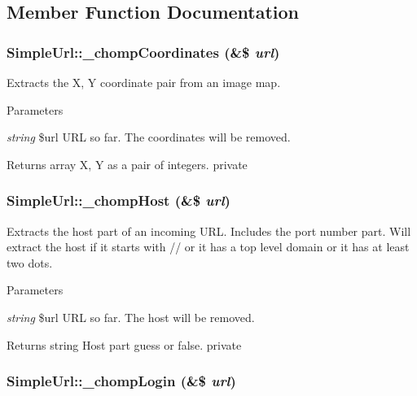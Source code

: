 \subsection{Member Function Documentation}
\hypertarget{class_simple_url_ad8bf75a7593335e51703bfbf083af970}{
\subsubsection[{\_\-chompCoordinates}]{\setlength{\rightskip}{0pt plus 5cm}SimpleUrl::\_\-chompCoordinates (\&\$ {\em url})}}
\label{class_simple_url_ad8bf75a7593335e51703bfbf083af970}
Extracts the X, Y coordinate pair from an image map. 
\begin{DoxyParams}{Parameters}
\item[{\em string}]\$url URL so far. The coordinates will be removed. \end{DoxyParams}
\begin{DoxyReturn}{Returns}
array X, Y as a pair of integers.  private 
\end{DoxyReturn}
\hypertarget{class_simple_url_a5c9eeea66a62feeec54e2c3fb4507d86}{
\subsubsection[{\_\-chompHost}]{\setlength{\rightskip}{0pt plus 5cm}SimpleUrl::\_\-chompHost (\&\$ {\em url})}}
\label{class_simple_url_a5c9eeea66a62feeec54e2c3fb4507d86}
Extracts the host part of an incoming URL. Includes the port number part. Will extract the host if it starts with // or it has a top level domain or it has at least two dots. 
\begin{DoxyParams}{Parameters}
\item[{\em string}]\$url URL so far. The host will be removed. \end{DoxyParams}
\begin{DoxyReturn}{Returns}
string Host part guess or false.  private 
\end{DoxyReturn}
\hypertarget{class_simple_url_a8dc8cc4e853a2561bb60dd002dff5f5f}{
\subsubsection[{\_\-chompLogin}]{\setlength{\rightskip}{0pt plus 5cm}SimpleUrl::\_\-chompLogin (\&\$ {\em url})}}
